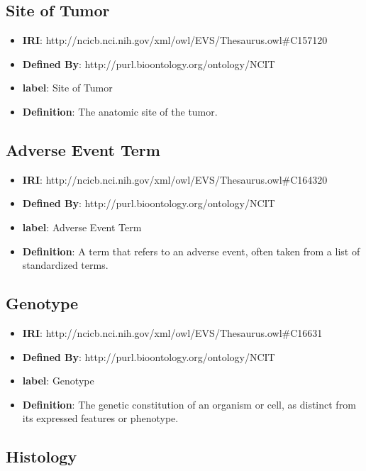 \documentclass[a4paper,12pt,oneside]{article}
\begin{document}
  \subsection{Site of Tumor}

   \begin{itemize}
      \item \textbf{IRI}: http://ncicb.nci.nih.gov/xml/owl/EVS/Thesaurus.owl\#C157120
      \item \textbf{Defined By}: http://purl.bioontology.org/ontology/NCIT
      \item \textbf{label}: Site of Tumor
      \item \textbf{Definition}: The anatomic site of the tumor.
  \end{itemize}


   \subsection{Adverse Event Term}

   \begin{itemize}
      \item \textbf{IRI}: http://ncicb.nci.nih.gov/xml/owl/EVS/Thesaurus.owl\#C164320
      \item \textbf{Defined By}: http://purl.bioontology.org/ontology/NCIT
      \item \textbf{label}: Adverse Event Term
      \item \textbf{Definition}: A term that refers to an adverse event, often taken from a list of standardized terms.
  \end{itemize}  


  \subsection{Genotype}

   \begin{itemize}
      \item \textbf{IRI}: http://ncicb.nci.nih.gov/xml/owl/EVS/Thesaurus.owl\#C16631
      \item \textbf{Defined By}: http://purl.bioontology.org/ontology/NCIT
      \item \textbf{label}: Genotype
      \item \textbf{Definition}: The genetic constitution of an organism or cell, as distinct from its expressed features or phenotype.
  \end{itemize}  


   \subsection{Histology}
\end{document}
